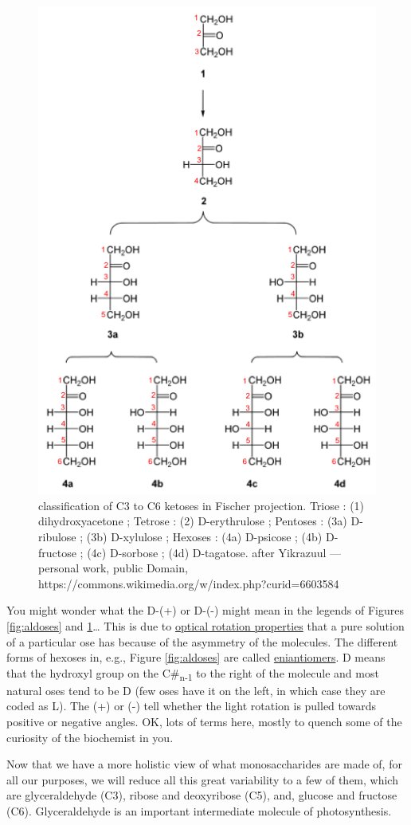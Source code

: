 \documentclass[]{book}
\theoremstyle{definition}
\theoremstyle{definition}
\theoremstyle{definition}
\theoremstyle{remark}
\begin{document}
\begin{figure}

{\centering \includegraphics[width=0.5\linewidth]{pictures/ketoses+nb} 

}

\caption{classification of C3 to C6 ketoses in Fischer projection. Triose : (1) dihydroxyacetone ; Tetrose : (2) D-erythrulose ; Pentoses : (3a) D-ribulose ; (3b) D-xylulose ; Hexoses : (4a) D-psicose ; (4b) D-fructose ; (4c) D-sorbose ; (4d) D-tagatose. after Yikrazuul — personal work, public Domain, https://commons.wikimedia.org/w/index.php?curid=6603584 }\label{fig:ketoses}
\end{figure}

You might wonder what the D-(+) or D-(-) might mean in the legends of
Figures \ref{fig:aldoses} and \ref{fig:ketoses}\ldots{} This is due to
\href{https://en.wikipedia.org/wiki/Optical_rotation}{optical rotation
properties} that a pure solution of a particular ose has because of the
asymmetry of the molecules. The different forms of hexoses in, e.g.,
Figure \ref{fig:aldoses} are called
\protect\hyperlink{https:ux2fux2fen.wikipedia.orgux2fwikiux2fEnantiomer}{eniantiomers}.
D means that the hydroxyl group on the C\#\textsubscript{n-1} to the
right of the molecule and most natural oses tend to be D (few oses have
it on the left, in which case they are coded as L). The (+) or (-) tell
whether the light rotation is pulled towards positive or negative
angles. OK, lots of terms here, mostly to quench some of the curiosity
of the biochemist in you.

Now that we have a more holistic view of what monosaccharides are made
of, for all our purposes, we will reduce all this great variability to a
few of them, which are glyceraldehyde (C3), ribose and deoxyribose (C5),
and, glucose and fructose (C6). Glyceraldehyde is an important
intermediate molecule of photosynthesis.
\end{document}
